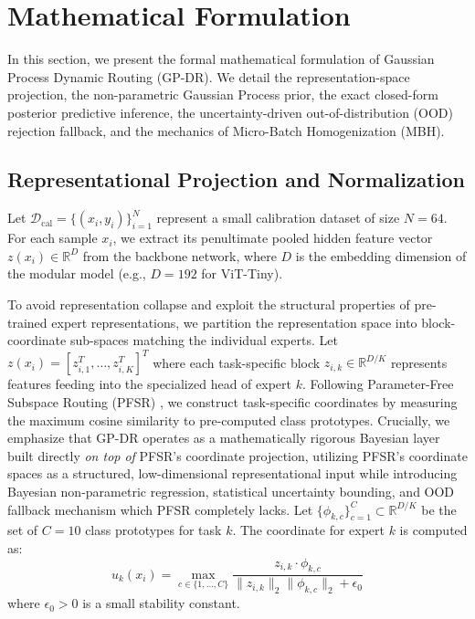 \section{Mathematical Formulation}
\label{sec:method}

In this section, we present the formal mathematical formulation of Gaussian Process Dynamic Routing (GP-DR). We detail the representation-space projection, the non-parametric Gaussian Process prior, the exact closed-form posterior predictive inference, the uncertainty-driven out-of-distribution (OOD) rejection fallback, and the mechanics of Micro-Batch Homogenization (MBH).

\subsection{Representational Projection and Normalization}
Let $\mathcal{D}_{\text{cal}} = \{(x_i, y_i)\}_{i=1}^N$ represent a small calibration dataset of size $N = 64$.
For each sample $x_i$, we extract its penultimate pooled hidden feature vector $z(x_i) \in \mathbb{R}^D$ from the backbone network, where $D$ is the embedding dimension of the modular model (e.g., $D=192$ for ViT-Tiny). 

To avoid representation collapse and exploit the structural properties of pre-trained expert representations, we partition the representation space into block-coordinate sub-spaces matching the individual experts. Let $z(x_i) = [z_{i,1}^T, \dots, z_{i,K}^T]^T$ where each task-specific block $z_{i,k} \in \mathbb{R}^{D/K}$ represents features feeding into the specialized head of expert $k$. Following Parameter-Free Subspace Routing (PFSR) \cite{leland2024pfsr}, we construct task-specific coordinates by measuring the maximum cosine similarity to pre-computed class prototypes. Crucially, we emphasize that GP-DR operates as a mathematically rigorous Bayesian layer built directly \emph{on top of} PFSR's coordinate projection, utilizing PFSR's coordinate spaces as a structured, low-dimensional representational input while introducing Bayesian non-parametric regression, statistical uncertainty bounding, and OOD fallback mechanism which PFSR completely lacks. Let $\{\phi_{k,c}\}_{c=1}^C \subset \mathbb{R}^{D/K}$ be the set of $C=10$ class prototypes for task $k$. The coordinate for expert $k$ is computed as:
\begin{equation}
u_k(x_i) = \max_{c \in \{1,\dots,C\}} \frac{z_{i,k} \cdot \phi_{k,c}}{\|z_{i,k}\|_2 \|\phi_{k,c}\|_2 + \epsilon_0}
\end{equation}
where $\epsilon_0 > 0$ is a small stability constant. 

